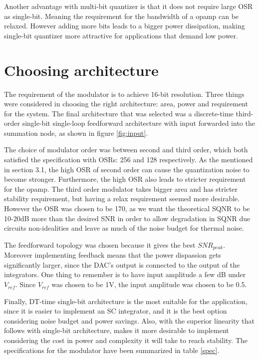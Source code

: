 Another advantage with multi-bit quantizer is that it does not require large OSR as single-bit. Meaning the requirement for the bandwidth of a opamp can be relaxed. However adding more bits leads to a bigger power dissipation, making single-bit quantizer more attractive for applications that demand low power.

\section{Choosing architecture}
The requirement of the modulator is to achieve 16-bit resolution. Three things were considered in choosing the right architecture: area, power and requirement for the system. The final architecture that was selected was a discrete-time third-order single-bit single-loop feedforward architecture with input forwarded into the summation node, as shown in figure \ref{fig:input}.

The choice of modulator order was between second and third order, which both satisfied the specification with OSRs: 256 and 128 respectively. As the mentioned in section 3.1, the high OSR of second order can cause the quantization noise to become stronger. Furthermore, the high OSR also leads to stricter requirement for the opamp. The third order modulator takes bigger area and has stricter stability requirement, but having a relax requirement seemed more desirable. However the OSR was chosen to be 170, as we want the theoretical SQNR to be 10-20dB more than the desired SNR in order to allow degradation in SQNR due circuits non-idealities and leave as much of the noise budget for thermal noise\cite[Ch.9.2]{Richard}.

The feedforward topology was chosen because it gives the best $SNR_{peak}$. Moreover implementing feedback means that the power dispassion gets significantly larger, since the DAC's output is connected to the output of the integrators. One thing to remember is to have input amplitude a few dB under $V_{ref}$. Since $V_{ref}$ was chosen to be 1V, the input amplitude was chosen to be 0.5.

Finally, DT-time single-bit architecture is the most suitable for the application, since it is easier to implement an SC integrator, and it is the best option considering noise budget and power savings. Also, with the superior linearity that follows with single-bit architecture, makes it more desirable to implement considering the cost in power and complexity it will take to reach stability. The specifications for the modulator have been 
summarized in table \ref{spec}.

